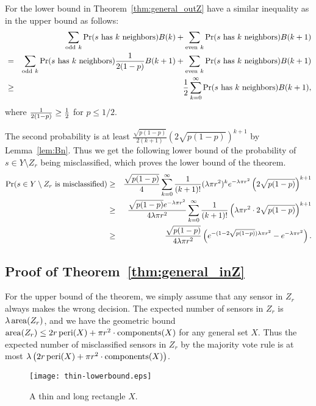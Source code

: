 \documentclass{article}
\def\Pr{\mathop{\rm Pr}}
\def\area{\mathop{\rm area}}
\def\peri{\mathop{\rm peri}}
\def\components{\mathop{\rm components}}
\begin{document}
\par
For the lower bound in Theorem~\ref{thm:general_outZ} have a similar inequality as in the upper bound as follows:
\begin{eqnarray*}
 & & \sum_{\mathrm{odd~} k} \Pr(\hbox{$s$ has $k$ neighbors}) B(k) +
       \sum_{\mathrm{even~} k} \Pr(\hbox{$s$ has $k$ neighbors}) B(k+1) \nonumber \\
 & = &  \sum_{\mathrm{odd~} k} \Pr(\hbox{$s$ has $k$ neighbors}){1\over 2(1-p)}B(k+1)
        +  \sum_{\mathrm{even~} k} \Pr(\hbox{$s$ has $k$ neighbors}) B(k+1) \nonumber \\
 &\geq& \frac{1}{2}\sum_{k=0}^{\infty} \Pr(\hbox{$s$ has $k$ neighbors}) B(k+1),
\end{eqnarray*}
where ${1\over 2(1-p)}\geq \frac{1}{2}$ for $p\leq 1/2$.

The second probability is at least $\frac{\sqrt{p(1-p)}}{2(k+1)}\left(2\sqrt{p(1-p)}\right)^{k+1}$ by Lemma~\ref{lem:Bn}. Thus we get the following lower bound of the probability of $s \in Y\setminus Z_r$ being misclassified, which proves the lower bound of the theorem.
\begin{eqnarray*}
\Pr(\hbox{$s \in Y\setminus Z_r$ is misclassified})&\geq&
\frac{\sqrt{p(1-p)}}{4} \sum_{k=0}^\infty {1\over (k+1)!}(\lambda\pi r^2)^k e^{-\lambda\pi r^2}
\left( 2\sqrt{p(1-p)}\right)^{k+1} \\
&\geq& \frac{\sqrt{p(1-p)}e^{-\lambda\pi r^2}}{4\lambda\pi r^2} \sum_{k=0}^\infty {1\over (k+1)!}\left(\lambda\pi r^2 \cdot 2\sqrt{p(1-p)}\right)^{k+1} \label{eq:interior2}\\
&\geq& {\sqrt{p(1-p)} \over 4\lambda\pi r^2} \left(e^{-(1-2\sqrt{p(1-p)})\lambda\pi r^2}-e^{-\lambda\pi r^2}\right).
\end{eqnarray*}


\subsection{Proof of Theorem~\ref{thm:general_inZ}}
For the upper bound of the theorem, we simply assume that any sensor in $Z_r$ always makes the wrong decision. The expected number of sensors in $Z_r$ is $\lambda\area(Z_r)$, and we have the geometric bound $\area(Z_r)\leq 2r\peri(X) +\pi r^2\cdot\components(X)$ for any general set $X$. Thus the expected number of misclassified sensors in $Z_r$ by the majority vote rule is at most $\lambda\left(2r\peri(X) + \pi r^2\cdot\components(X) \right)$.

\begin{figure}
\centering
    \texttt{[image: thin-lowerbound.eps]}
\caption{A thin and long rectangle $X$.}
\label{fig:thin-lowerbound}
\end{figure}
\end{document}

